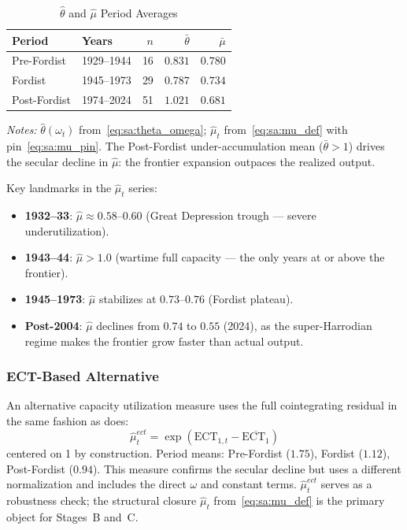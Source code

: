 \begin{table}[htbp]
\centering
\caption{$\hat{\theta}$ and $\hat{\mu}$ Period Averages}
\label{tab:sa:mu_periods}
\begin{threeparttable}
\begin{tabular}{llrrr}
\toprule
Period & Years & $n$ & $\bar{\theta}$ & $\bar{\mu}$ \\
\midrule
Pre-Fordist  & 1929--1944 & 16 & $0.831$ & $0.780$ \\
Fordist      & 1945--1973 & 29 & $0.787$ & $0.734$ \\
Post-Fordist & 1974--2024 & 51 & $1.021$ & $0.681$ \\
\bottomrule
\end{tabular}
\begin{tablenotes}
\small
\item \textit{Notes:} $\hat{\theta}(\omega_t)$
from~\eqref{eq:sa:theta_omega}; $\hat{\mu}_t$
from~\eqref{eq:sa:mu_def} with pin~\eqref{eq:sa:mu_pin}. The
Post-Fordist under-accumulation mean ($\bar{\theta} > 1$) drives
the secular decline in $\hat{\mu}$: the frontier expansion outpaces the realized output. 
\end{tablenotes}
\end{threeparttable}
\end{table}

Key landmarks in the $\hat{\mu}_t$ series:
%
\begin{itemize}
    \item \textbf{1932--33}: $\hat{\mu} \approx 0.58$--$0.60$ (Great
        Depression trough --- severe underutilization).
    \item \textbf{1943--44}: $\hat{\mu} > 1.0$ (wartime full capacity ---
        the only years at or above the frontier).
    \item \textbf{1945--1973}: $\hat{\mu}$ stabilizes at $0.73$--$0.76$
        (Fordist plateau).
    \item \textbf{Post-2004}: $\hat{\mu}$ declines from $0.74$ to $0.55$
        (2024), as the super-Harrodian regime makes the frontier grow
        faster than actual output.
\end{itemize}

\subsubsection{ECT-Based Alternative}
\label{app:sa:mu_ect}

An alternative capacity utilization measure uses the full cointegrating
residual in the same fashion as \citet{Shaikh2016} does: 
%
\begin{equation}
    \hat{\mu}^{ect}_t = \exp\!\left(\text{ECT}_{1,t}
    - \overline{\text{ECT}_1}\right)
    \label{eq:sa:mu_ect}
\end{equation}
%
centered on 1 by construction. Period means: Pre-Fordist ($1.75$),
Fordist ($1.12$), Post-Fordist ($0.94$). This measure confirms the secular
decline but uses a different normalization and includes the direct $\omega$
and constant terms. $\hat{\mu}^{ect}_t$ serves as a robustness check;
the structural closure $\hat{\mu}_t$ from~\eqref{eq:sa:mu_def} is the
primary object for Stages~B and~C.


